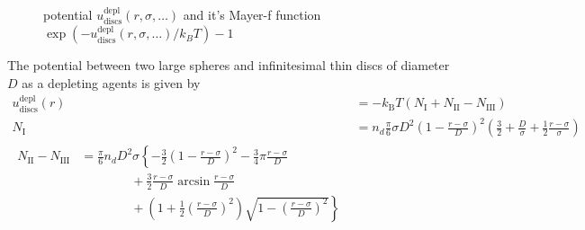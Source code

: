 \begin{figure}[htb]
\captionsetup[subfigure]{position=b}
\centering
{}
\hfill
{}
\caption{potential $u^\text{depl}_\text{discs}(r,\sigma,\ldots)$ and it's Mayer-f function $\exp(-u^\text{depl}_\text{discs}(r,\sigma,\ldots)/k_BT)-1$}
\end{figure}

The potential between two large spheres and infinitesimal thin discs of diameter $D$
as a depleting agents is given by
\begin{align}
u^\text{depl}_\text{discs}(r) &= -k_\text{B} T (N_\text{I}+N_\text{II}-N_\text{III}) \\
N_\text{I} &= n_d \frac{\pi}{6}\sigma D^2 \left(1-\frac{r-\sigma}{D}\right)^2
                \left(\frac{3}{2}+\frac{D}{\sigma}+\frac{1}{2}\frac{r-\sigma}{\sigma}\right)\\
\begin{split}
N_\text{II} - N_\text{III} &= \frac{\pi}{6} n_d D^2\sigma
                              \left\{ -\frac{3}{2}\left(1-\frac{r-\sigma}{D}\right)^2
                                      -\frac{3}{4}\pi\frac{r-\sigma}{D} \right. \\
                           & \qquad \qquad + \frac{3}{2}\frac{r-\sigma}{D} \arcsin \frac{r-\sigma}{D}  \\
                           & \qquad \qquad + \left.
                              \left(1+\frac{1}{2}\left(\frac{r-\sigma}{D}\right)^2\right)
                                   \sqrt{1-\left(\frac{r-\sigma}{D}\right)^2}
                              \right\}
\end{split}
\end{align}

